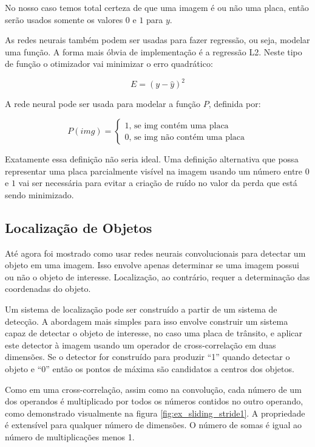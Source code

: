 No nosso caso temos total certeza de que uma imagem é ou não uma placa, então
serão usados somente os valores $0$ e $1$ para $y$.

As redes neurais também podem ser usadas para fazer regressão, ou seja, modelar
uma função. A forma mais óbvia de implementação é a regressão L2. Neste tipo de
função o otimizador vai minimizar o erro quadrático:

\begin{equation}
	E=\left( y - \widehat{y} \right)^2
\end{equation}

A rede neural pode ser usada para modelar a função $P$, definida por:

\begin{equation}
	P(img) = \begin{cases}
		1 \text{, se img contém uma placa} \\
		0 \text{, se img não contém uma placa}
	\end{cases}
\end{equation}

Exatamente essa definição não seria ideal. Uma definição alternativa que possa
representar uma placa parcialmente visível na imagem usando um número entre 0 e
$1$ vai ser necessária para evitar a criação de ruído no valor da perda que está
sendo minimizado.

\subsection{Localização de Objetos} \label{sec:localiz_objetos}
Até agora foi mostrado como usar redes neurais convolucionais para detectar um
objeto em uma imagem. Isso envolve apenas determinar se uma imagem possui ou não
o objeto de interesse. Localização, ao contrário, requer a determinação das
coordenadas do objeto.

Um sistema de localização pode ser construído a partir de um sistema de
detecção. A abordagem mais simples para isso envolve construir um sistema capaz
de detectar o objeto de interesse, no caso uma placa de trânsito, e aplicar este
detector à imagem usando um operador de cross-correlação em duas dimensões. Se o
detector for construído para produzir “1” quando detectar o objeto e “0” então
os pontos de máxima são candidatos a centros dos objetos.

Como em uma cross-correlação, assim como na convolução, cada número de um dos
operandos é multiplicado por todos os números contidos no outro operando, como
demonstrado visualmente na figura \ref{fig:ex_sliding_stride1}. A propriedade
é extensível para qualquer número de dimensões. O número de somas é igual ao
número de multiplicações menos 1.


